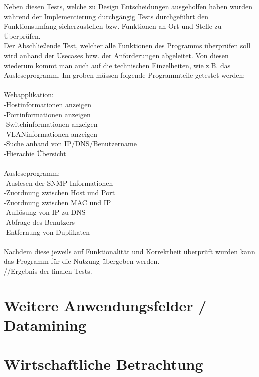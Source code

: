 Neben diesen Tests, welche zu Design Entscheidungen ausgeholfen haben wurden während der Implementierung durchgängig Tests durchgeführt den Funktionsumfang sicherzustellen bzw. Funktionen an Ort und Stelle zu Überprüfen.\\
Der Abschließende Test, welcher alle Funktionen des Programms überprüfen soll wird anhand der Usecases bzw. der Anforderungen abgeleitet. Von diesen wiederum kommt man auch auf die technischen Einzelheiten, wie z.B. das Ausleseprogramm.
Im groben müssen folgende Programmteile getestet werden:\\
\\
Webapplikation:\\
-Hostinformationen anzeigen\\
-Portinformationen anzeigen\\
-Switchinformationen anzeigen\\
-VLANinformationen anzeigen\\
-Suche anhand von IP/DNS/Benutzername\\
-Hierachie Übersicht\\
\\
Ausleseprogramm:\\
-Auslesen der SNMP-Informationen\\
-Zuordnung zwischen Host und Port \\
-Zuordnung zwischen MAC und IP\\
-Auflösung von IP zu DNS\\
-Abfrage des Benutzers\\
-Entfernung von Duplikaten\\
\\
Nachdem diese jeweils auf Funktionalität und Korrektheit überprüft wurden kann das Programm für die Nutzung übergeben werden.\\
//Ergebnis der finalen Tests.


\section{Weitere Anwendungsfelder / Datamining}
\label{sec:otherthoughts}

\section{Wirtschaftliche Betrachtung}
\label{sec:economicloverview}
